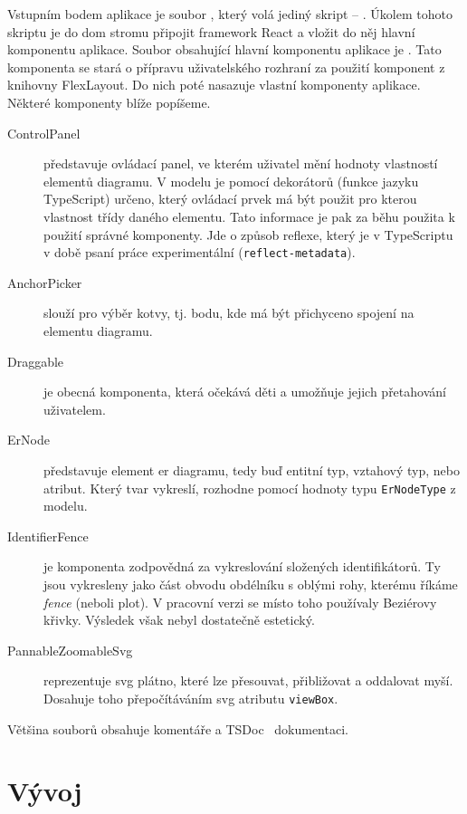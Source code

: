 Vstupním bodem aplikace je soubor , který volá jediný skript -- .
Úkolem tohoto skriptu je do \acrshort{dom} stromu připojit framework React a vložit do něj hlavní komponentu aplikace.
Soubor obsahující hlavní komponentu aplikace je .
Tato komponenta se stará o přípravu uživatelského rozhraní za použití komponent z knihovny FlexLayout.
Do nich poté nasazuje vlastní komponenty aplikace.
Některé komponenty blíže popíšeme.

\begin{description}
  \item[ControlPanel] představuje ovládací panel, ve kterém uživatel mění hodnoty vlastností elementů diagramu.
    V modelu je pomocí dekorátorů (funkce jazyku TypeScript) určeno, který ovládací prvek má být použit pro kterou vlastnost třídy daného elementu.
    Tato informace je pak za běhu použita k použití správné komponenty.
    Jde o způsob reflexe, který je v TypeScriptu v době psaní práce experimentální (\texttt{reflect-metadata}).
  \item[AnchorPicker] slouží pro výběr kotvy, tj. bodu, kde má být přichyceno spojení na elementu diagramu.
  \item[Draggable] je obecná komponenta, která očekává děti a umožňuje jejich přetahování uživatelem.
  \item[ErNode] představuje element \acrshort{er} diagramu, tedy buď entitní typ, vztahový typ, nebo atribut.
    Který tvar vykreslí, rozhodne pomocí hodnoty typu \texttt{ErNodeType} z modelu.
  \item[IdentifierFence] je komponenta zodpovědná za vykreslování složených identifikátorů.
    Ty jsou vykresleny jako část obvodu obdélníku s oblými rohy, kterému říkáme \emph{fence} (neboli plot).
    V pracovní verzi se místo toho používaly Beziérovy křivky.
    Výsledek však nebyl dostatečně estetický.
  \item[PannableZoomableSvg] reprezentuje \acrshort{svg} plátno, které lze přesouvat, přibližovat a oddalovat myší.
    Dosahuje toho přepočítáváním \acrshort{svg} atributu \texttt{viewBox}.
\end{description}

Většina souborů obsahuje komentáře a TSDoc~\cite{microsoft_whattsdoc_} dokumentaci.

\section{Vývoj}\label{section:development}

